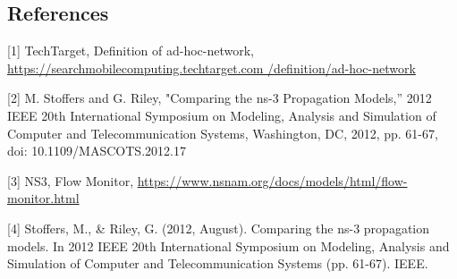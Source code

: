 \documentclass[a4paper, twocolumn, twoside, 12pt]{article}
\begin{document}
\subsection*{References \vspace{-0.2em}} 
\setlength{\parindent}{0em}
[1] TechTarget, Definition of ad-hoc-network, \href{https://searchmobilecomputing.techtarget.com/definition/ad-hoc-network}{https://searchmobilecomputing.techtarget.com
/definition/ad-hoc-network}

[2] M. Stoffers and G. Riley, "Comparing the ns-3 Propagation Models,” 2012 IEEE 20th International Symposium on Modeling, Analysis and Simulation of Computer and Telecommunication Systems, Washington, DC, 2012, pp. 61-67, doi: 10.1109/MASCOTS.2012.17

[3] NS3, Flow Monitor, \href{https://www.nsnam.org/docs/models/html/flow-monitor.html}{https://www.nsnam.org/docs/models/html/flow-monitor.html}

[4] Stoffers, M., \& Riley, G. (2012, August). Comparing the ns-3 propagation models. In 2012 IEEE 20th International Symposium on Modeling, Analysis and Simulation of Computer and Telecommunication Systems (pp. 61-67). IEEE.
\end{document}
